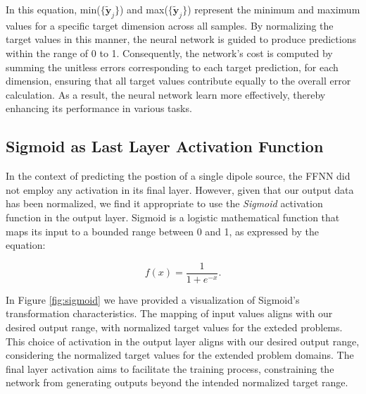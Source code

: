 \documentclass[a4paper, UKenglish, 11pt]{uiomaster}
\begin{document}
In this equation, min($\{\tilde{\mathbf{y}}_j\}$) and max($\{\tilde{\mathbf{y}}_j\}$) represent the minimum and maximum values for a specific target dimension across all samples. By normalizing the target values in this manner, the neural network is guided to produce predictions within the range of 0 to 1. Consequently, the network's cost is computed by summing the unitless errors corresponding to each target prediction, for each dimension, ensuring that all target values contribute equally to the overall error calculation. As a result, the neural network learn more effectively, thereby enhancing its performance in various tasks.



\subsection{Sigmoid as Last Layer Activation Function}
In the context of predicting the postion of a single dipole source, the FFNN did not employ any activation in its final layer. However, given that our output data has been normalized, we find it appropriate to use the \emph{Sigmoid} activation function in the output layer. Sigmoid is a logistic mathematical function that maps its input to a bounded range between 0 and 1, as expressed by the equation:

\begin{equation}
  f(x) = \frac{1}{1 + e^{-x}}.
\label{eq:Sigmoid}
\end{equation}

In Figure \ref{fig:sigmoid} we have provided a visualization of Sigmoid's transformation characteristics. The mapping of input values aligns with our desired output range, with normalized target values for the exteded problems. This choice of activation in the output layer aligns with our desired output range, considering the normalized target values for the extended problem domains. The final layer activation aims to facilitate the training process, constraining the network from generating outputs beyond the intended normalized target range.
\end{document}
